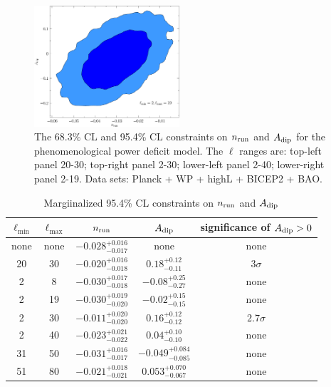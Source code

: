\documentclass[11pt]{article}
\def \halffigwidth{0.48\textwidth}
\begin{document}
\begin{figure}
  \includegraphics[width = \halffigwidth]{ldip2to19_nrun_dipamp_2D.pdf} 
  \caption{The 68.3\% CL and 95.4\% CL constraints on $n_{\rm run}$ and $A_{\rm dip}$ for the phenomenological power deficit model. The $\ell$ ranges are: top-left panel 20-30;  top-right panel 2-30; lower-left panel 2-40; lower-right panel 2-19. Data sets: Planck + WP + highL + BICEP2 + BAO. \label{fig:nrunadip}}
\end{figure}


\begin{table}
\caption{Margiinalized 95.4\% CL constraints on $n_{\rm run}$ and $A_{\rm dip}$ \label{tbl:nrunadip}}
\centering
\begin{tabular}{ccccc}
\hline
\hline
$\ell_{\min}$ & $\ell_{\max}$ & $n_{\rm run}$ & $A_{\rm dip}$ & significance of $A_{\rm dip}>0$\\
\hline
none & none & $-0.028^{+0.016}_{-0.017}$ & none & none \\
20   & 30 & $-0.020^{+0.016}_{-0.018}$ & $0.18^{+0.12}_{-0.11}$ & $3\sigma$\\
2 & 8 & $-0.030^{+0.017}_{-0.018}$  & $-0.08^{+0.25}_{-0.27}$ & none \\
2 & 19 & $-0.030^{+0.019}_{-0.020}$ &    $-0.02^{+0.15}_{-0.15}$ & none \\
2 & 30 &  $-0.011^{+0.020}_{-0.020}$   & $0.16^{+0.12}_{-0.12}$ & $2.7\sigma$\\
2 & 40 & $-0.023^{+0.021}_{-0.022}$  &  $0.04^{+0.10}_{-0.10}$ & none \\
31 & 50 & $-0.031^{+0.016}_{-0.017}$  & $-0.049^{+0.084}_{-0.085}$ & none\\
51 & 80 & $-0.021^{+0.018}_{-0.021}$  & $0.053^{+0.070}_{-0.067}$ & none\\
\hline
\end{tabular}
\end{table}
\end{document}
